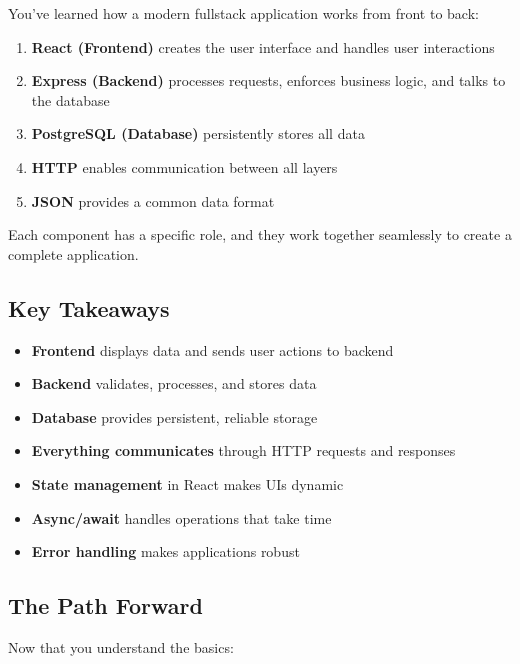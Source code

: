 \documentclass[12pt,a4paper]{article}
\begin{document}
You've learned how a modern fullstack application works from front to back:

\begin{enumerate}
    \item \textbf{React (Frontend)} creates the user interface and handles user interactions
    \item \textbf{Express (Backend)} processes requests, enforces business logic, and talks to the database
    \item \textbf{PostgreSQL (Database)} persistently stores all data
    \item \textbf{HTTP} enables communication between all layers
    \item \textbf{JSON} provides a common data format
\end{enumerate}

Each component has a specific role, and they work together seamlessly to create a complete application.

\subsection{Key Takeaways}

\begin{tcolorbox}[colback=green!5!white,colframe=green!75!black,title=Remember]
\begin{itemize}
    \item \textbf{Frontend} displays data and sends user actions to backend
    \item \textbf{Backend} validates, processes, and stores data
    \item \textbf{Database} provides persistent, reliable storage
    \item \textbf{Everything communicates} through HTTP requests and responses
    \item \textbf{State management} in React makes UIs dynamic
    \item \textbf{Async/await} handles operations that take time
    \item \textbf{Error handling} makes applications robust
\end{itemize}
\end{tcolorbox}

\subsection{The Path Forward}

Now that you understand the basics:
\end{document}
